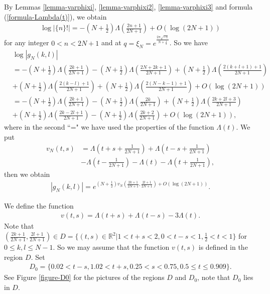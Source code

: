 \documentclass[12pt]{amsart}
\begin{document}
By Lemmas \ref{lemma-varphixi}, \ref{lemma-varphixi2}, \ref{lemma-varphixi3} and formula (\ref{formula-Lambda(t)}), we obtain 
\begin{align}
    \log \left|\{n\}!\right|=-(N+\frac{1}{2})\Lambda\left(\frac{2n+1}{2N+1}\right)+O(\log (2N+1))
\end{align}  
for any integer $0<n<2N+1$ and at $q=\xi_N=e^{\frac{2\pi \sqrt{-1}}{N+\frac{1}{2}}}$.
So we have 
\begin{align}
    &\log|g_N(k,l)|\\\nonumber
    &=-(N+\frac{1}{2})\Lambda\left(\frac{2k+1}{2N+1}\right)-(N+\frac{1}{2})\Lambda\left(\frac{2N+2k+1}{2N+1}\right)+(N+\frac{1}{2})\Lambda\left(\frac{2(k+l+1)+1}{2N+1}\right)\\\nonumber
    &+(N+\frac{1}{2})\Lambda\left(\frac{2(k-l)+1}{2N+1}\right)+(N+\frac{1}{2})\Lambda\left(\frac{2(N-k-1)+1}{2N+1}\right)+O(\log (2N+1)) \\\nonumber
    &=-(N+\frac{1}{2})\Lambda\left(\frac{2k+1}{2N+1}\right)-(N+\frac{1}{2})\Lambda\left(\frac{2k}{2N+1}\right)+(N+\frac{1}{2})\Lambda\left(\frac{2k+2l+3}{2N+1}\right)\\\nonumber
    &+(N+\frac{1}{2})\Lambda\left(\frac{2k-2l+1}{2N+1}\right)-(N+\frac{1}{2})\Lambda\left(\frac{2k+2}{2N+1}\right)+O(\log (2N+1)), 
\end{align}
where in the second ``=" we have used the properties of the function $\Lambda(t)$. 
We put
\begin{align}
    v_N(t,s)&=\Lambda\left(t+s+\frac{1}{2N+1}\right)+\Lambda\left(t-s+\frac{1}{2N+1}\right)\\\nonumber
    &-\Lambda\left(t-\frac{1}{2N+1}\right)-\Lambda\left(t\right)-\Lambda\left(t+\frac{1}{2N+1}\right), 
\end{align}
then we obtain 
\begin{align}
    |g_N(k,l)|=e^{(N+\frac{1}{2})v_N\left(\frac{2k+1}{2N+1},\frac{2l+1}{2N+1}\right)+O(\log (2N+1))}. 
\end{align}

We define the function
\begin{align} \label{formula-vts}
    v(t,s)=\Lambda(t+s)+\Lambda(t-s)-3\Lambda\left(t\right).
\end{align}
Note that $\left(\frac{2k+1}{2N+1},\frac{2l+1}{2N+1}\right)\in D=\{(t,s)\in \mathbb{R}^2| 1< t+s< 2, 0< t-s<1, \frac{1}{2}< t<1\}$ for $0\leq k,l\leq N-1$. So we may assume that
the function $v(t,s)$ is defined in the region $D$. Set
\begin{align}
    D_0=\{0.02< t-s, 1.02 < t+s, 0.25 < s< 0.75, 0.5\leq t\leq 0.909\}.
\end{align}
See Figure \ref{figure-D0} for the pictures of the regions $D$ and $D_0$, note that $D_0$ lies in $D$.  
\end{document}
